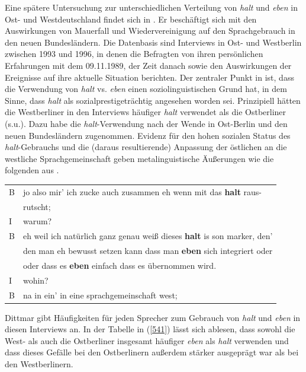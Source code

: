 Eine spätere Untersuchung zur unterschiedlichen Verteilung von \textit{halt} und \textit{eben} in Ost- und Westdeutschland findet sich in \citet{Dittmar2000}. Er beschäftigt sich mit den Auswirkungen von Mauerfall und Wiedervereinigung auf den Sprachgebrauch in den neuen Bundesländern. Die Datenbasis sind Interviews in Ost- und Westberlin zwischen 1993 und 1996, in denen die Befragten von ihren persönlichen Erfahrungen mit dem 09.11.1989, der Zeit danach sowie den Auswirkungen der Ereignisse auf ihre aktuelle Situation berichten. Der zentraler Punkt in \citet[213]{Dittmar2000} ist, dass die Verwendung von \textit{halt} vs. \textit{eben} einen soziolinguistischen Grund hat, in dem Sinne, dass \textit{halt} als sozialprestigeträchtig angesehen worden sei. Prinzipiell hätten die Westberliner in den Interviews häufiger \textit{halt} verwendet als die Ostberliner (s.u.). Dazu habe die \textit{halt}-Verwendung nach der \glq Wende \grq {} in Ost-Berlin und den neuen Bundesländern zugenommen. Evidenz für den hohen sozialen Status des \textit{halt}-Gebrauchs und die (daraus resultierende) Anpassung der östlichen an die westliche Sprachgemeinschaft geben metalinguistische Äußerungen wie die folgenden aus \citet[230]{Dittmar2000}.
\begin{exe}
	\ex\label{540} 
		\begin{tabular}[t]{ll} 
 		B & jo also mir' ich zucke auch zusammen eh wenn mit das \textbf{halt} raus-   \tabularnewline
 		 & rutscht;   \tabularnewline
 		I & warum? \tabularnewline
 		B & eh weil ich natürlich ganz genau weiß dieses \textbf{halt} is son marker, den' \tabularnewline
 		& den man eh bewusst setzen kann dass man \textbf{eben} sich integriert oder \tabularnewline
 		& oder dass es \textbf{eben} einfach dass es übernommen wird. \tabularnewline
 		I & wohin? \tabularnewline
 		B &	na in ein' in eine sprachgemeinschaft west;	
  		\end{tabular}				
\end{exe}																	
Dittmar gibt Häufigkeiten für jeden Sprecher zum Gebrauch von \textit{halt} und \textit{eben} in diesen Interviews an. In der Tabelle in (\ref{541}) lässt sich ablesen, dass sowohl die West- als auch die Ostberliner insgesamt häufiger \textit{eben} als \textit{halt} verwenden und dass dieses Gefälle bei den Ostberlinern außerdem stärker ausgeprägt war als bei den Westberlinern.

